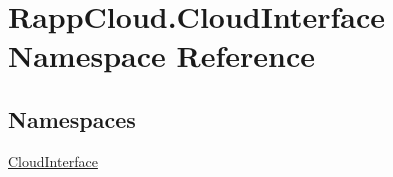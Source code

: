 \hypertarget{namespaceRappCloud_1_1CloudInterface}{\section{Rapp\-Cloud.\-Cloud\-Interface Namespace Reference}
\label{namespaceRappCloud_1_1CloudInterface}
}
\subsection*{Namespaces}
\begin{DoxyCompactItemize}
\item 
\hyperlink{namespaceRappCloud_1_1CloudInterface_1_1CloudInterface}{Cloud\-Interface}
\end{DoxyCompactItemize}
